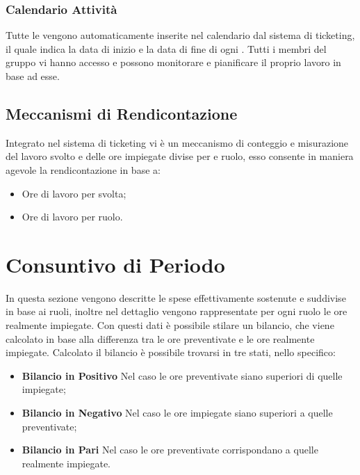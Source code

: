 \documentclass{scalatekids-article}
\begin{document}
\subsubsection{Calendario Attività}
Tutte le  vengono automaticamente inserite nel calendario dal sistema di ticketing, il quale
indica la data di inizio e la data di fine di ogni . Tutti i membri del gruppo vi hanno accesso
e possono monitorare e pianificare il proprio lavoro in base ad esse.
\subsection{Meccanismi di Rendicontazione}
Integrato nel sistema di ticketing vi è un meccanismo di conteggio e misurazione del lavoro svolto
e delle ore impiegate divise per  e ruolo, esso consente in maniera agevole la rendicontazione
in base a:
\begin{itemize}
\item{Ore di lavoro per  svolta;}
\item{Ore di lavoro per ruolo.}
\end{itemize}
\newpage
\section{Consuntivo di Periodo}
In questa sezione vengono descritte le spese effettivamente sostenute e suddivise in base ai ruoli,
inoltre nel dettaglio vengono rappresentate per ogni ruolo le ore realmente impiegate. Con questi
dati è possibile stilare un bilancio, che viene calcolato in base alla differenza tra le ore preventivate
e le ore realmente impiegate.
Calcolato il bilancio è possibile trovarsi in tre stati, nello specifico:
\begin{itemize}
\item{\textbf{Bilancio in Positivo} Nel caso le ore preventivate siano superiori di quelle impiegate;}
\item{\textbf{Bilancio in Negativo} Nel caso le ore impiegate siano superiori a quelle preventivate;}
\item{\textbf{Bilancio in Pari} Nel caso le ore preventivate corrispondano a quelle realmente impiegate.}
\end{itemize}
\end{document}
